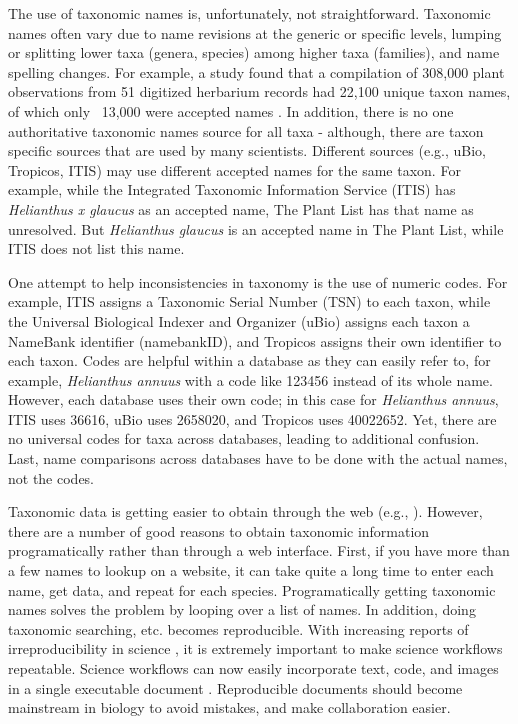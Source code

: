 \documentclass[10pt]{article}\usepackage[]{graphicx}\usepackage[]{color}
\begin{document}
The use of taxonomic names is, unfortunately, not straightforward. Taxonomic names often vary due to name revisions at the generic or specific levels, lumping or splitting lower taxa (genera, species) among higher taxa (families), and name spelling changes. For example, a study found that a compilation of 308,000 plant observations from 51 digitized herbarium records had 22,100 unique taxon names, of which only ~13,000 were accepted names \cite{weiser2007,boyle2013}. In addition, there is no one authoritative taxonomic names source for all taxa - although, there are taxon specific sources that are used by many scientists. Different sources (e.g., uBio, Tropicos, ITIS) may use different accepted names for the same taxon. For example, while the Integrated Taxonomic Information Service (ITIS) has \emph{Helianthus x glaucus} as an accepted name, The Plant List \cite{theplantlist} has that name as unresolved. But \emph{Helianthus glaucus} is an accepted name in The Plant List, while ITIS does not list this name. 

One attempt to help inconsistencies in taxonomy is the use of numeric codes. For example, ITIS assigns a Taxonomic Serial Number (TSN) to each taxon, while the Universal Biological Indexer and Organizer (uBio) assigns each taxon a NameBank identifier (namebankID), and Tropicos assigns their own identifier to each taxon. Codes are helpful within a database as they can easily refer to, for example, \emph{Helianthus annuus} with a code like 123456 instead of its whole name. However, each database uses their own code; in this case for \emph{Helianthus annuus}, ITIS uses 36616, uBio uses 2658020, and Tropicos uses 40022652. Yet, there are no universal codes for taxa across databases, leading to additional confusion. Last, name comparisons across databases have to be done with the actual names, not the codes. 

Taxonomic data is getting easier to obtain through the web (e.g., \cite{eol}). However, there are a number of good reasons to obtain taxonomic information programatically rather than through a web interface. First, if you have more than a few names to lookup on a website, it can take quite a long time to enter each name, get data, and repeat for each species. Programatically getting taxonomic names solves the problem by looping over a list of names. In addition, doing taxonomic searching, etc. becomes reproducible. With increasing reports of irreproducibility in science \cite{stodden2010,zimmer2012}, it is extremely important to make science workflows repeatable. Science workflows can now easily incorporate text, code, and images in a single executable document \cite{yihui2013}. Reproducible documents should become mainstream in biology to avoid mistakes, and make collaboration easier.
\end{document}
